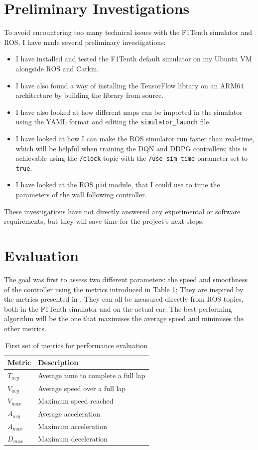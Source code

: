 \section{Preliminary Investigations}
\label{preli}
To avoid encountering too many technical issues with the F1Tenth simulator and ROS, I have made several preliminary investigations: 
\begin{itemize}
	\item I have installed and tested the F1Tenth default simulator on my Ubuntu VM alongside ROS and Catkin.
	\item I have also found a way of installing the TensorFlow library on an ARM64 architecture by building the library from source. 
	\item I have also looked at how different maps can be imported in the simulator using the YAML format and editing the \verb |simulator_launch| file.
	\item I have looked at how I can make the ROS simulator run faster than real-time, which will be helpful when training the DQN and DDPG controllers; this is achievable using the \verb |/clock| topic with the \verb |/use_sim_time| parameter set to \verb |true|.
	\item I have looked at the ROS \verb|pid| module, that I could use to tune the parameters of the wall following controller.
\end{itemize}


These investigations have not directly answered any experimental or software requirements, but they will save time for the project's next steps.

\section{Evaluation}
\label{eva}

The goal was first to assess two different parameters: the speed and smoothness of the controller using the metrics introduced in Table \ref{table:1}; They are inspired by the metrics presented in \cite{benchmark}. They can all be measured directly from ROS topics, both in the F1Tenth simulator and on the actual car. The best-performing algorithm will be the one that maximises the average speed and minimises the other metrics.

\begin{table}[H]
\centering
\begin{tabularx}{\textwidth}{||l X||}
 \hline
 Metric & Description\\ [0.5ex]
 \hline\hline
 $T_{avg}$ & Average time to complete a full lap \\
 $V_{avg}$ & Average speed over a full lap \\
 $V_{max}$ & Maximum speed reached \\
 $A_{avg}$ & Average acceleration \\
 $A_{max}$ & Maximum acceleration \\
 $D_{max}$ & Maximum deceleration \\ [1ex]
\hline
\end{tabularx}
\caption{First set of metrics for performance evaluation}
\label{table:1}
\end{table}

